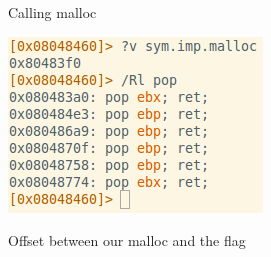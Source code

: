 \documentclass{beamer}
\begin{document}
\begin{frame}{Calling malloc}
    \begin{center}
            \includegraphics[width=.7\textwidth]{exp400_imp.png}
    \end{center}
\end{frame}

\begin{frame}{Offset between our \alert{malloc} and the flag}
    \begin{center}
    \end{center}
\end{frame}
\end{document}
